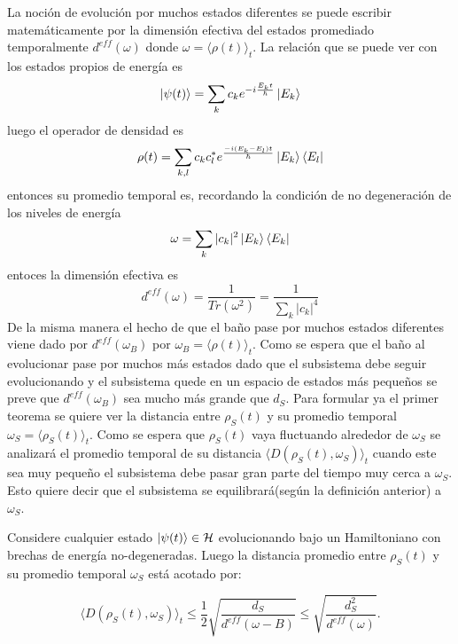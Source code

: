 La noción de evolución por muchos estados diferentes se puede escribir matemáticamente por la dimensión efectiva del estados promediado temporalmente $d^{eff}(\omega)$ donde $\omega=\langle \rho(t) \rangle_{t}$. La relación que se puede ver con los estados propios de energía es 
\begin{equation}
\ket{\psi(t)} = \sum_{k} c_{k} e^{-i\frac{E_{k}t}{\hbar}} \ket{E_{k}}
\end{equation}
luego el operador de densidad es 
\begin{equation}
\rho(t)=\sum_{k,l} c_{k} c_{l}^{*} e^{\frac{-i(E_{k}-E_{l})t}{\hbar}}\ket{E_{k}} \bra{E_{l}}
\end{equation}
entonces su promedio temporal es, recordando la condición de no degeneración de los niveles de energía
\begin{equation}
\omega= \sum_{k} |c_{k}|^{2} \ket{E_{k}} \bra{E_{k}}
\end{equation}
entoces la dimensión efectiva es 
\begin{equation}
d^{eff}(\omega)=\frac{1}{Tr(\omega^{2})}=\frac{1}{\sum_{k} |c_{k}|^{4} }
\end{equation}
De la misma manera el hecho de que el baño pase por muchos estados diferentes viene dado por $d^{eff}(\omega_{B})$ por $\omega_{B}=\langle \rho(t) \rangle_{t}$. Como se espera que el baño al evolucionar pase por muchos más estados dado que el subsistema debe seguir evolucionando y el subsistema quede en un espacio de estados más pequeños se preve que $d^{eff}(\omega_{B})$ sea mucho más grande que $d_{S}$. Para formular ya el primer teorema se quiere ver la distancia entre $\rho_{S}(t)$ y su promedio temporal $\omega_{S}= \langle \rho_{S}(t) \rangle_{t}$. Como se espera que $\rho_{S}(t) $ vaya fluctuando alrededor de $\omega_{S}$ se analizará el promedio temporal de su distancia $\langle D(\rho_{S}(t) ,\omega_{S}) \rangle_{t}$ cuando este sea muy pequeño el subsistema debe pasar gran parte del tiempo muy cerca a $\omega_{S}$. Esto quiere decir que el subsistema se equilibrará(según la definición anterior) a $\omega_{S}$.
\begin{theorem}
Considere cualquier estado $\ket{\psi(t)} \in \mathcal{H}$ evolucionando bajo un Hamiltoniano con brechas de energía no-degeneradas. Luego la distancia promedio entre $\rho_{S}(t)$ y su promedio temporal $\omega_{S}$ está acotado por:

\begin{equation}
\langle D(\rho_{S}(t) ,\omega_{S}) \rangle_{t} \le \frac{1}{2} \sqrt{\frac{d_{S}}{d^{eff}(\omega-{B})}} \le \sqrt{\frac{d_{S}^{2}}{d^{eff}(\omega)}}.
\end{equation}
\end{theorem}

